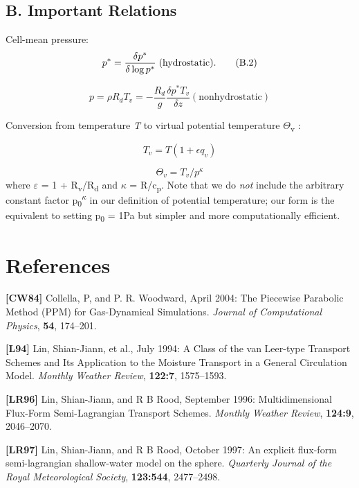 \subsection*{B. Important Relations}

Cell-\/mean pressure\+: \[ p^* = \frac{\delta p^*}{\delta \log p^*} \; \mathrm{(hydrostatic)} \\. \tag {B.2} \]

\[ p = \rho R_d T_v = - \frac{R_d}{g} \frac{\delta p^* T_v}{\delta z} \mathrm{(nonhydrostatic)} \tag {B.3} \]

Conversion from temperature {\itshape T} to virtual potential temperature {$\Theta$}\textsubscript{v} \+:

\[ T_v = T \left ( 1 + \epsilon q_v \right ) \tag {B.4} \]

\[ \Theta_v = T_v / p^\kappa \tag {B.5} \] where {$\varepsilon$} = 1 + R\textsubscript{v}/R\textsubscript{d} and {$\kappa$} = R/c\textsubscript{p}. Note that we do {\itshape not} include the arbitrary constant factor p\textsubscript{0}\textsuperscript{{$\kappa$}} in our definition of potential temperature; our form is the equivalent to setting p\textsubscript{0} = 1\+Pa but simpler and more computationally efficient. \hypertarget{references}{}\section{References}\label{references}
{\bfseries \mbox{[}C\+W84\mbox{]}} Collella, P, and P. R. Woodward, April 2004\+: The Piecewise Parabolic Method (P\+PM) for Gas-\/\+Dynamical Simulations. {\itshape Journal of Computational Physics}, {\bfseries 54}, 174--201.

{\bfseries \mbox{[}L94\mbox{]}} Lin, Shian-\/\+Jiann, et al., July 1994\+: A Class of the van Leer-\/type Transport Schemes and Its Application to the Moisture Transport in a General Circulation Model. {\itshape Monthly Weather Review}, {\bfseries 122\+:7}, 1575--1593.

{\bfseries \mbox{[}L\+R96\mbox{]}} Lin, Shian-\/\+Jiann, and R B Rood, September 1996\+: Multidimensional Flux-\/\+Form Semi-\/\+Lagrangian Transport Schemes. {\itshape Monthly Weather Review}, {\bfseries 124\+:9}, 2046--2070.

{\bfseries \mbox{[}L\+R97\mbox{]}} Lin, Shian-\/\+Jiann, and R B Rood, October 1997\+: An explicit flux-\/form semi-\/lagrangian shallow-\/water model on the sphere. {\itshape Quarterly Journal of the Royal Meteorological Society}, {\bfseries 123\+:544}, 2477--2498.

